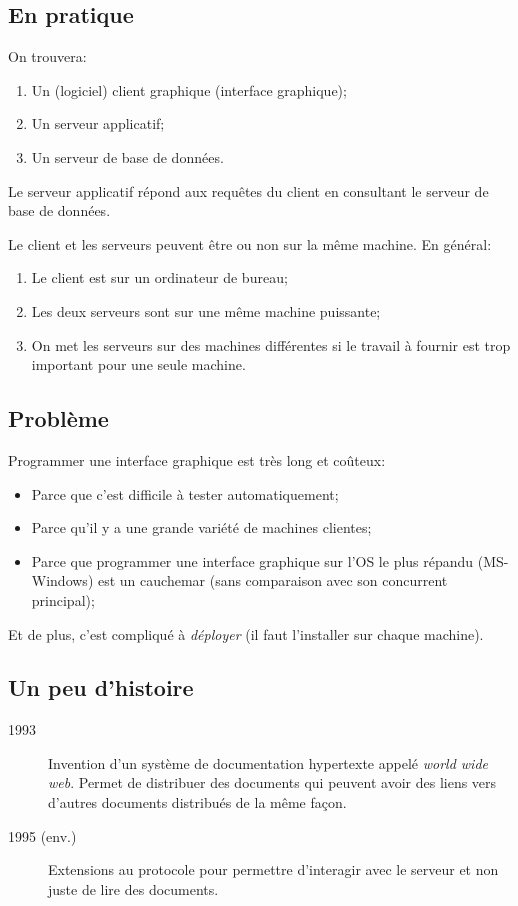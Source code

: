\subsection{En pratique}
On trouvera:
\begin{enumerate}
\item Un (logiciel) client graphique (interface graphique);
\item Un serveur applicatif;
\item Un serveur de base de données.
\end{enumerate}

Le serveur applicatif répond aux requêtes du client en consultant le
serveur de base de données.

Le client et les serveurs peuvent être ou non sur la même machine. En
général:
\begin{enumerate}
\item Le client est sur un ordinateur de bureau;
\item Les deux serveurs sont sur une même machine puissante;
\item On met les serveurs sur des machines différentes si le travail à
  fournir est trop important pour une seule machine.
\end{enumerate}

\subsection{Problème}

Programmer une interface graphique est très long et coûteux:
\begin{itemize}
\item Parce que c'est difficile à tester automatiquement;
\item Parce qu'il y a une grande variété de machines
  clientes;
\item Parce que programmer une interface graphique sur l'OS le plus
  répandu (MS-Windows) est un cauchemar (sans comparaison
  avec son concurrent principal);
\end{itemize}
Et de plus, c'est compliqué à \emph{déployer} (il faut l'installer sur chaque
machine).
\subsection{Un peu d'histoire}

\begin{description}
\item[1993] Invention d'un système de documentation hypertexte appelé
  \textit{world wide web}. Permet de distribuer des documents qui
  peuvent avoir des liens vers d'autres documents distribués de la
  même façon.
\item[1995 (env.)] Extensions au protocole pour permettre d'interagir
  avec le serveur et non juste de lire des documents.
\end{description}

